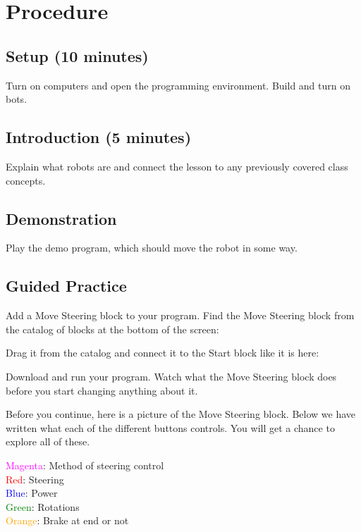 \documentclass{lessonplan}
\begin{document}
      
  \section{Procedure}
    \subsection{Setup (10 minutes)}
      Turn on computers and open the programming environment. Build and turn on bots.
    \subsection{Introduction (5 minutes)}
      Explain what robots are and connect the lesson to any previously covered class concepts.
    \subsection{Demonstration}
      Play the demo program, which should move the robot in some way.
    \subsection{Guided Practice}
    Add a Move Steering block to your program.
    Find the Move Steering block from the catalog of blocks at the bottom of the screen:
    

    Drag it from the catalog and connect it to the Start block like it is here:
    


    Download and run your program. Watch what the Move Steering block does before you start changing anything about it.
    \par
    Before you continue, here is a picture of the Move Steering block. Below we have written what each of the different buttons controls. You will get a chance to explore all of these.

    \textcolor{magenta}{Magenta}: Method of steering control \hfill \\
    \textcolor{red}{Red}: Steering  \hfill \\
    \textcolor{blue}{Blue}: Power  \hfill \\
    \textcolor{green}{Green}: Rotations  \hfill \\
    \textcolor{orange}{Orange}: Brake at end or not  \hfill \\
\end{document}
